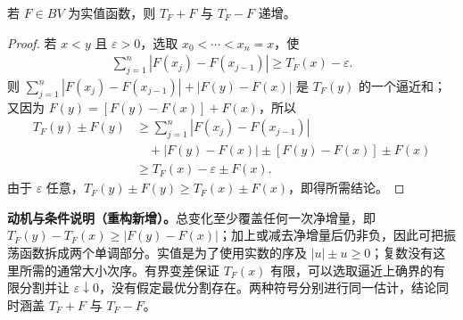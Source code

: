 \documentclass[../../main.tex]{subfiles}%
\begin{document}
\begin{lemma}\label{lemma:ch03-variation-monotone-parts}
若 $F\in BV$ 为实值函数，则 $T_F+F$ 与 $T_F-F$ 递增。
\end{lemma}
\begin{proof}
若 $x<y$ 且 $\varepsilon>0$，选取 $x_0<\cdots<x_n=x$，使
\begin{align*}
\sum_{j=1}^n|F(x_j)-F(x_{j-1})|\ge T_F(x)-\varepsilon.
\end{align*}
则 $\sum_{j=1}^n|F(x_j)-F(x_{j-1})|+|F(y)-F(x)|$ 是 $T_F(y)$ 的一个逼近和；又因为 $F(y)=[F(y)-F(x)]+F(x)$，所以
\begin{align*}
T_F(y)\pm F(y)
&\ge\sum_{j=1}^n|F(x_j)-F(x_{j-1})|\\
&\quad+|F(y)-F(x)|\pm[F(y)-F(x)]\pm F(x)\\
&\ge T_F(x)-\varepsilon\pm F(x).
\end{align*}
由于 $\varepsilon$ 任意，$T_F(y)\pm F(y)\ge T_F(x)\pm F(x)$，即得所需结论。
\end{proof}
\begin{remark}
\textbf{动机与条件说明（重构新增）。}总变化至少覆盖任何一次净增量，即 $T_F(y)-T_F(x)\ge|F(y)-F(x)|$；加上或减去净增量后仍非负，因此可把振荡函数拆成两个单调部分。实值是为了使用实数的序及 $|u|\pm u\ge0$；复数没有这里所需的通常大小次序。有界变差保证 $T_F(x)$ 有限，可以选取逼近上确界的有限分割并让 $\varepsilon\downarrow0$，没有假定最优分割存在。两种符号分别进行同一估计，结论同时涵盖 $T_F+F$ 与 $T_F-F$。
\end{remark}
\end{document}
